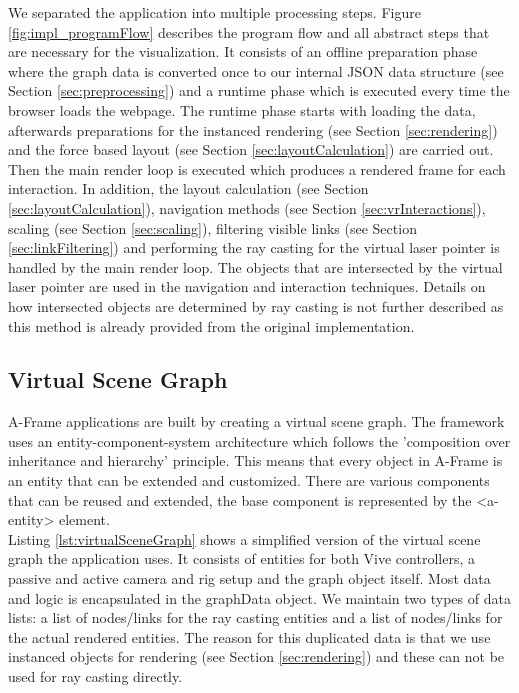 We separated the application into multiple processing steps. Figure \ref{fig:impl_programFlow} describes the program flow and all abstract steps that are necessary for the visualization.
It consists of an offline preparation phase where the graph data is converted once to our internal JSON data structure (see Section \ref{sec:preprocessing}) and a runtime phase which is executed every time the browser loads the webpage.
The runtime phase starts with loading the data, afterwards preparations for the instanced rendering (see Section \ref{sec:rendering}) and the force based layout (see Section \ref{sec:layoutCalculation}) are carried out.
Then the main render loop is executed which produces a rendered frame for each interaction. In addition, the layout calculation (see Section \ref{sec:layoutCalculation}), navigation methods (see Section \ref{sec:vrInteractions}), scaling (see Section \ref{sec:scaling}), filtering visible links (see Section \ref{sec:linkFiltering}) and performing the ray casting for the virtual laser pointer is handled by the main render loop.
The objects that are intersected by the virtual laser pointer are used in the navigation and interaction techniques. 
Details on how intersected objects are determined by ray casting is not further described as this method is already provided from the original implementation. 

\subsection{Virtual Scene Graph}
A-Frame applications are built by creating a virtual scene graph.
The framework uses an entity-component-system architecture which follows the 'composition over inheritance and hierarchy' principle. 
This means that every object in A-Frame is an entity that can be extended and customized.
There are various components that can be reused and extended, the base component is represented by the <a-entity> element.\\
Listing \ref{lst:virtualSceneGraph} shows a simplified version of the virtual scene graph the application uses. 
It consists of entities for both Vive controllers, a passive and active camera and rig setup and the graph object itself.
Most data and logic is encapsulated in the graphData object. We maintain two types of data lists: a list of nodes/links for the ray casting entities and a list of nodes/links for the actual rendered entities. 
The reason for this duplicated data is that we use  instanced objects for rendering (see Section \ref{sec:rendering}) and these can not be used for ray casting directly.
\pagebreak

